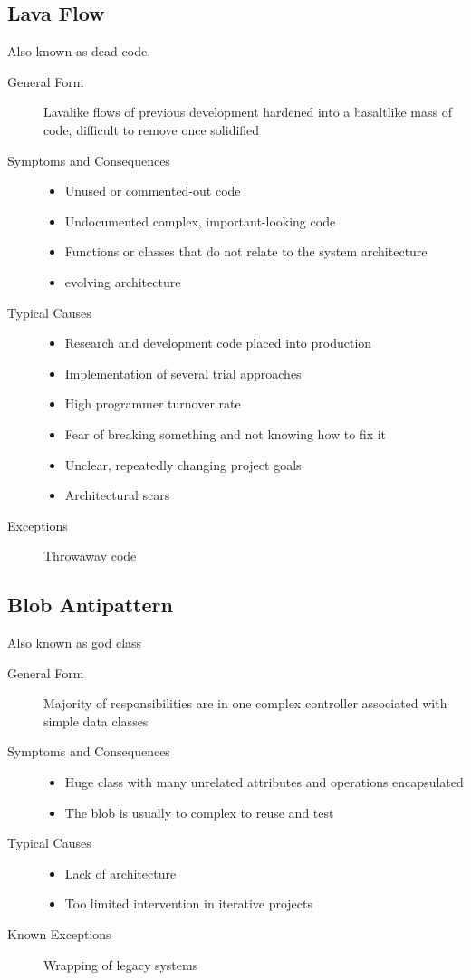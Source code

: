 \subsection{Lava Flow}
Also known as dead code.
\begin{description}
  \item[General Form] Lavalike flows of previous development hardened into a basaltlike mass of code, difficult to remove once solidified
  \item[Symptoms and Consequences] \hfill
  \begin{itemize}
    \item Unused or commented-out code
    \item Undocumented complex, important-looking code
    \item Functions or classes that do not relate to the system architecture
    \item evolving architecture
  \end{itemize}
  \item[Typical Causes] \hfill
  \begin{itemize}
    \item Research and development code placed into production
    \item Implementation of several trial approaches
    \item High programmer turnover rate
    \item Fear of breaking something and not knowing how to fix it
    \item Unclear, repeatedly changing project goals
    \item Architectural scars
  \end{itemize}
  \item[Exceptions] Throwaway code
\end{description}
\newpage

\subsection{Blob Antipattern}
Also known as god class
\begin{description}
  \item[General Form] Majority of responsibilities are in one complex controller associated with simple data classes
  \item[Symptoms and Consequences] \hfill
  \begin{itemize}
    \item Huge class with many unrelated attributes and operations encapsulated
    \item The blob is usually to complex to reuse and test
  \end{itemize}
  \item[Typical Causes] \hfill
  \begin{itemize}
    \item Lack of architecture
    \item Too limited intervention in iterative projects
  \end{itemize}
  \item[Known Exceptions] Wrapping of legacy systems
\end{description}
\newpage

